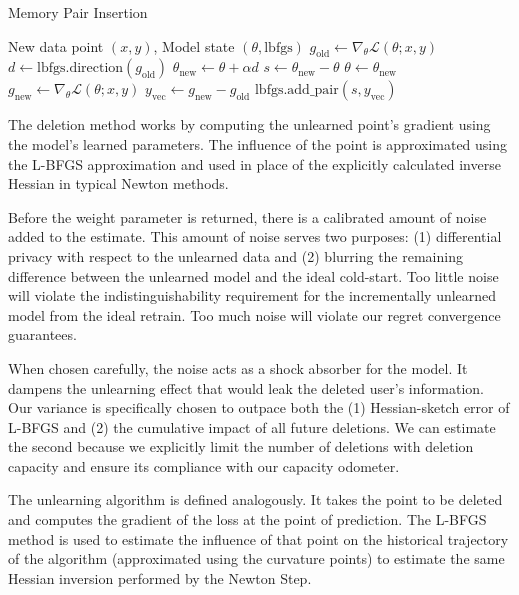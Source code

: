\documentclass[a4paper,12pt]{article}
\begin{document}
\begin{algorithm}
\caption{Memory Pair Insertion}\label{alg:insertion}
\begin{algorithmic}
\Require New data point $(x, y)$, Model state $(\theta, \text{lbfgs})$
\State $g_{\text{old}} \gets \nabla_{\theta} \mathcal{L}(\theta; x, y)$
\State $d \gets \text{lbfgs.direction}(g_{\text{old}})$
\State $\theta_{\text{new}} \gets \theta + \alpha d$
\State
\State $s \gets \theta_{\text{new}} - \theta$
\State $\theta \gets \theta_{\text{new}}$
\State $g_{\text{new}} \gets \nabla_{\theta} \mathcal{L}(\theta; x, y)$
\State $y_{\text{vec}} \gets g_{\text{new}} - g_{\text{old}}$
\State
\State $\text{lbfgs.add\_pair}(s, y_{\text{vec}})$
\end{algorithmic}
\end{algorithm}

The deletion method works by computing the unlearned point's gradient using the model's learned parameters. The influence of the point is approximated using the L-BFGS approximation and used in place of the explicitly calculated inverse Hessian in typical Newton methods. 

Before the weight parameter is returned, there is a calibrated amount of noise added to the estimate. This amount of noise serves two purposes: (1) differential privacy with respect to the unlearned data and (2) blurring the remaining difference between the unlearned model and the ideal cold-start. Too little noise will violate the indistinguishability requirement for the incrementally unlearned model from the ideal retrain. Too much noise will violate our regret convergence guarantees.

When chosen carefully, the noise acts as a shock absorber for the model. It dampens the unlearning effect that would leak the deleted user's information. Our variance is specifically chosen to outpace both the (1) Hessian-sketch error of L-BFGS and (2) the cumulative impact of all future deletions. We can estimate the second because we explicitly limit the number of deletions with deletion capacity and ensure its compliance with our capacity odometer.

The unlearning algorithm is defined analogously. It takes the point to be deleted and computes the gradient of the loss at the point of prediction. The L-BFGS method is used to estimate the influence of that point on the historical trajectory of the algorithm (approximated using the curvature points) to estimate the same Hessian inversion performed by the Newton Step.
\end{document}
